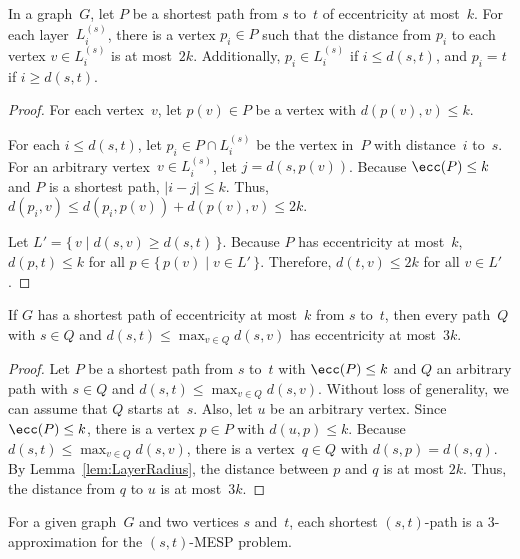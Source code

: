 \begin{lemma}
    \label{lem:LayerRadius}
In a graph~\( G \), let \( P \) be a shortest path from \( s \) to~\( t \) of eccentricity at most~\( k \).
For each layer~\( L_i^{(s)} \), there is a vertex \( p_i \in P \) such that the distance from \( p_i \) to each vertex \( v \in L_i^{(s)} \) is at most~\( 2k \).
Additionally, \( p_i \in L_i^{(s)} \) if \( i \leq d(s,t) \), and \( p_i = t \) if \( i \geq d(s,t) \).
\end{lemma}

\begin{proof}
For each vertex~$v$, let $p(v) \in P$ be a vertex with $d(p(v), v) \leq k$.

For each $i \leq d(s,t)$, let $p_i \in P \cap L_i^{(s)}$ be the vertex in~$P$ with distance~$i$ to~$s$.
For an arbitrary vertex~$v \in L_i^{(s)}$, let $j = d(s,p(v))$.
Because $\ecc(P) \leq k$ and $P$ is a shortest path, $|i-j| \leq k$.
Thus, $d(p_i,v) \leq d(p_i,p(v)) + d(p(v),v) \leq 2k$.

Let $L' = \{ \, v \mid d(s,v) \geq d(s,t) \, \}$.
Because $P$ has eccentricity at most~$k$, $d(p,t) \leq k$ for all $p \in \{ \, p(v) \mid v \in L' \, \}$.
Therefore, $d(t,v) \leq 2k$ for all $v \in L'$.
\end{proof}

\begin{lemma}
    \label{lem:3kDomPath}
If \( G \) has a shortest path of eccentricity at most~\( k \) from \( s \) to~\( t \), then every path~\( Q \) with \( s \in Q \) and \( d(s,t) \leq \max_{v \in Q}d(s,v) \) has eccentricity at most~\( 3k \).
\end{lemma}

\begin{proof}
Let $P$ be a shortest path from $s$ to~$t$ with $\ecc(P) \leq k$ and $Q$ an arbitrary path with $s \in Q$ and $d(s,t) \leq \max_{v \in Q}d(s,v)$.
Without loss of generality, we can assume that $Q$ starts at~$s$.
Also, let $u$ be an arbitrary vertex.
Since $\ecc(P) \leq k$, there is a vertex $p \in P$ with $d(u,p) \leq k$.
Because $d(s,t) \leq \max_{v \in Q}d(s,v)$, there is a vertex~$q \in Q$ with $d(s,p) = d(s,q)$.
By Lemma~\ref{lem:LayerRadius}, the distance between $p$ and $q$ is at most $2k$.
Thus, the distance from $q$ to $u$ is at most~$3k$.
\end{proof}

\begin{corollary}
    For a given graph~\( G \) and two vertices \( s \) and~\( t \), each shortest \( (s,t) \)-path is a \( 3 \)-approximation for the \( (s,t) \)-MESP problem.
\end{corollary}

